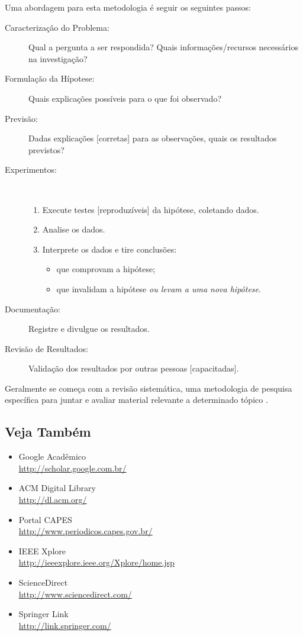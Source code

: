 Uma abordagem para esta metodologia é seguir os seguintes passos:
\begin{description}
	\item[Caracterização do Problema:] Qual a pergunta a ser respondida? Quais
informações/recursos necessários na investigação?
	\item[Formulação da Hípotese:] Quais explicações possíveis para o que foi observado?
	\item[Previsão:] Dadas explicações [corretas] para as observações, quais os
	resultados previstos?
	\item[Experimentos:] \ \\\vspace{-2em}
		\begin{enumerate}
			\item Execute testes [reproduzíveis] da hipótese, coletando dados.
			\item Analise os dados.
			\item Interprete os dados e tire conclusões:
				\begin{itemize}
				\item que comprovam a hipótese;
				\item que invalidam a hipótese \emph{ou levam a uma nova hipótese}.
				\end{itemize}
		\end{enumerate}
	\item[Documentação:] Registre e divulgue os resultados.
	\item[Revisão de Resultados:] Validação dos resultados por outras pessoas
	[capacitadas].
\end{description}%

Geralmente se começa com a revisão sistemática, uma metodologia de pesquisa
específica para juntar e avaliar material relevante a determinado tópico
\cite{Biolchini_2005_Systematicreviewin}.

\subsection{Veja Também}
\begin{itemize}
	\item Google Acadêmico
		\\\url{http://scholar.google.com.br/}%
	\item ACM Digital Library
		\\\url{http://dl.acm.org/}%
	\item Portal \acrshort{CAPES}
		\\\url{http://www.periodicos.capes.gov.br/}%
	\item IEEE Xplore
		\\\url{http://ieeexplore.ieee.org/Xplore/home.jsp}%
	\item ScienceDirect
		\\\url{http://www.sciencedirect.com/}%
	\item Springer Link
		\\\url{http://link.springer.com/}%
\end{itemize}

